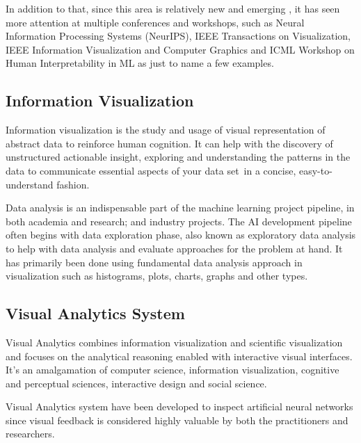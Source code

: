 In addition to that, since this area is relatively new and emerging \cite{Choo2018}, it has seen more attention at multiple conferences and workshops, such as Neural Information Processing Systems (NeurIPS), IEEE Transactions on Visualization, IEEE Information Visualization and Computer Graphics and ICML Workshop on Human Interpretability in ML as just to name a few examples.

\subsection{Information Visualization}

Information visualization is the study and usage of visual representation of abstract data to reinforce human cognition. It can help with the discovery of unstructured actionable insight, exploring and understanding the patterns in the data to communicate essential aspects of your data set in a concise, easy-to-understand fashion.

Data analysis is an indispensable part of the machine learning project pipeline, in both academia and research; and industry projects. The AI development pipeline often begins with data exploration phase, also known as exploratory data analysis to help with data analysis and evaluate approaches for the problem at hand. It has primarily been done using fundamental data analysis approach in visualization such as histograms, plots, charts, graphs and other types.

\subsection{Visual Analytics System}
    
Visual Analytics combines information visualization and scientific visualization and focuses on the analytical reasoning enabled with interactive visual interfaces. It’s an amalgamation of computer science, information visualization, cognitive and perceptual sciences, interactive design and social science.

Visual Analytics system have been developed to inspect artificial neural networks since visual feedback is considered highly valuable by both the practitioners and researchers.


